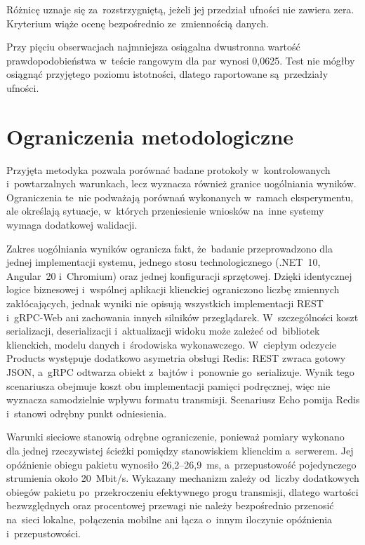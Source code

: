 Różnicę uznaje się za~rozstrzygniętą, jeżeli jej przedział ufności nie zawiera zera. Kryterium wiąże ocenę bezpośrednio ze~zmiennością danych.

Przy pięciu obserwacjach najmniejsza osiągalna dwustronna wartość prawdopodobieństwa w~teście rangowym dla par wynosi 0,0625. Test nie mógłby osiągnąć przyjętego poziomu istotności, dlatego raportowane są~przedziały ufności.

\section{Ograniczenia metodologiczne}
\label{sec:OgraniczeniaMetodologiczne}

Przyjęta metodyka pozwala porównać badane protokoły w~kontrolowanych i~powtarzalnych warunkach, lecz wyznacza również granice uogólniania wyników. Ograniczenia te~nie podważają porównań wykonanych w~ramach eksperymentu, ale określają sytuacje, w~których przeniesienie wniosków na~inne systemy wymaga dodatkowej walidacji.

Zakres uogólniania wyników ogranicza fakt, że~badanie przeprowadzono dla jednej implementacji systemu, jednego stosu technologicznego (.NET~10, Angular~20 i~Chromium) oraz jednej konfiguracji sprzętowej. Dzięki identycznej logice biznesowej i~wspólnej aplikacji klienckiej ograniczono liczbę zmiennych zakłócających, jednak wyniki nie opisują wszystkich implementacji REST i~gRPC-Web ani zachowania innych silników przeglądarek. W~szczególności koszt serializacji, deserializacji i~aktualizacji widoku może zależeć od~bibliotek klienckich, modelu danych i~środowiska wykonawczego. W~ciepłym odczycie Products występuje dodatkowo asymetria obsługi Redis: REST zwraca gotowy JSON, a~gRPC odtwarza obiekt z~bajtów i~ponownie go~serializuje. Wynik tego scenariusza obejmuje koszt obu implementacji pamięci podręcznej, więc nie wyznacza samodzielnie wpływu formatu transmisji. Scenariusz Echo pomija Redis i~stanowi odrębny punkt odniesienia.

Warunki sieciowe stanowią odrębne ograniczenie, ponieważ pomiary wykonano dla jednej rzeczywistej ścieżki pomiędzy stanowiskiem klienckim a~serwerem. Jej opóźnienie obiegu pakietu wynosiło 26,2--26,9~ms, a~przepustowość pojedynczego strumienia około 20~Mbit/s. Wykazany mechanizm zależy od~liczby dodatkowych obiegów pakietu po~przekroczeniu efektywnego progu transmisji, dlatego wartości bezwzględnych oraz procentowej przewagi nie należy bezpośrednio przenosić na~sieci lokalne, połączenia mobilne ani łącza o~innym iloczynie opóźnienia i~przepustowości.

